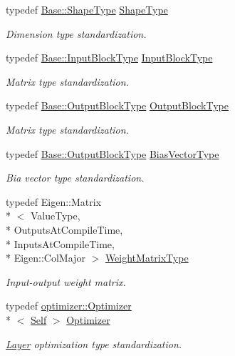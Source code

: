 \begin{DoxyCompactItemize}
typedef \hyperlink{classffnn_1_1layer_1_1_hidden_a7ed1a797fcb7bfb43d66c0eb24967882}{Base\-::\-Shape\-Type} \hyperlink{classffnn_1_1layer_1_1_fully_connected_a6087b3dca79894a83be146674d5eb99e}{Shape\-Type}
\begin{DoxyCompactList}\small\item\em Dimension type standardization. \end{DoxyCompactList}\item 
typedef \hyperlink{classffnn_1_1layer_1_1_hidden_a01b9cc4df01a7b26423dcd3a0af17b1c}{Base\-::\-Input\-Block\-Type} \hyperlink{classffnn_1_1layer_1_1_fully_connected_a8fb8f9b598085d3a05214f38f70adfc7}{Input\-Block\-Type}
\begin{DoxyCompactList}\small\item\em Matrix type standardization. \end{DoxyCompactList}\item 
typedef \hyperlink{classffnn_1_1layer_1_1_hidden_abb03ddc71360cc7ebdab03cd4d1553ee}{Base\-::\-Output\-Block\-Type} \hyperlink{classffnn_1_1layer_1_1_fully_connected_ac8c5ba1f20f470095c2c37f881f49814}{Output\-Block\-Type}
\begin{DoxyCompactList}\small\item\em Matrix type standardization. \end{DoxyCompactList}\item 
typedef \hyperlink{classffnn_1_1layer_1_1_hidden_abb03ddc71360cc7ebdab03cd4d1553ee}{Base\-::\-Output\-Block\-Type} \hyperlink{classffnn_1_1layer_1_1_fully_connected_a926ff519682fa1bedd4c38159d5fd4bb}{Bias\-Vector\-Type}
\begin{DoxyCompactList}\small\item\em Bia vector type standardization. \end{DoxyCompactList}\item 
typedef Eigen\-::\-Matrix\\*
$<$ Value\-Type, \\*
Outputs\-At\-Compile\-Time, \\*
Inputs\-At\-Compile\-Time, \\*
Eigen\-::\-Col\-Major $>$ \hyperlink{classffnn_1_1layer_1_1_fully_connected_a4ceb72064ac9a73a0907cc369d229da0}{Weight\-Matrix\-Type}
\begin{DoxyCompactList}\small\item\em Input-\/output weight matrix. \end{DoxyCompactList}\item 
typedef \hyperlink{classffnn_1_1optimizer_1_1_optimizer}{optimizer\-::\-Optimizer}\\*
$<$ \hyperlink{classffnn_1_1layer_1_1_fully_connected_a34f862e03a4a2d070013c6c732563a5f}{Self} $>$ \hyperlink{classffnn_1_1layer_1_1_fully_connected_a1d4b9ddaf2b993d3c9a62d7b3cca495f}{Optimizer}
\begin{DoxyCompactList}\small\item\em \hyperlink{classffnn_1_1layer_1_1_layer}{Layer} optimization type standardization. \end{DoxyCompactList}\end{DoxyCompactItemize}
